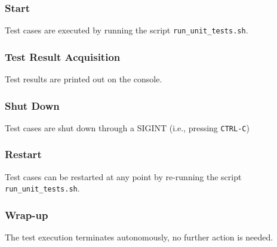 \subsubsection{Start}
Test cases are executed by running the script \texttt{run\_unit\_tests.sh}.
\subsubsection{Test Result Acquisition}
Test results are printed out on the console.
\subsubsection{Shut Down}
Test cases are shut down through a SIGINT (i.e., pressing \texttt{CTRL-C})
\subsubsection{Restart}
Test cases can be restarted at any point by re-running the script \texttt{run\_unit\_tests.sh}.
\subsubsection{Wrap-up}
The test execution terminates autonomously, no further action is needed.

